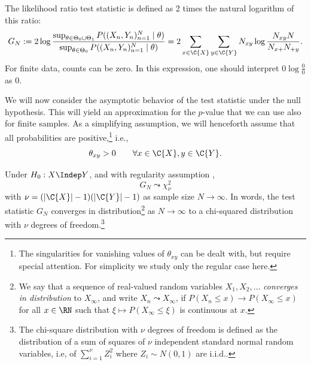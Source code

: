 The likelihood ratio test statistic is defined as 2 times the natural logarithm of this ratio:
\begin{equation}\label{eq:G_test_statistic}
  G_N := 2 \log \frac{\sup_{\theta\in\Theta_0\cup\Theta_1} P((X_n,Y_n)_{n=1}^N \mid \theta)}{\sup_{\theta\in\Theta_0} P((X_n,Y_n)_{n=1}^N \mid \theta)} = 2 \sum_{x\in\C{X}} \sum_{y\in\C{Y}} N_{xy} \log \frac{N_{xy} N}{N_{x+} N_{+ y}}.
\end{equation}
For finite data, counts can be zero. In this expression, one should interpret $0 \log \frac{0}{0}$ as $0$.

We will now consider the asymptotic behavior of the test statistic under the null hypothesis.
This will yield an approximation for the $p$-value that we can use also for finite samples.
As a simplifying assumption, we will henceforth assume that all probabilities are positive,\footnote{The singularities for vanishing values of $\theta_{xy}$ can be dealt with, but require special attention. For simplicity we study only the regular case here.} i.e.,
\begin{equation}\label{eq:G_test_regularity}
  \theta_{xy} > 0 \qquad \forall x \in \C{X}, y\in \C{Y}.
\end{equation}
\begin{Prp}\label{prp:G_test_asymptotics_H0}
Under $H_0 : X \Indep Y$, and with regularity assumption ,
$$G_N \leadsto \chi_\nu^2$$
with $\nu = (|\C{X}| - 1)(|\C{Y}| - 1)$ as sample size $N \to \infty$.
  In words, the test statistic $G_N$ converges in distribution\footnote{We say that a sequence of real-valued random variables $X_1,X_2,\dots$ \emph{converges in distribution} to $X_\infty$, and write $X_n \leadsto X_\infty$, if $P(X_n \le x) \to P(X_\infty \le x)$ for all $x \in \RN$ such that $\xi \mapsto P(X_\infty \le \xi)$ is continuous at $x$.} as $N \to \infty$ to a chi-squared distribution with $\nu$ degrees of freedom.\footnote{The chi-square distribution with $\nu$ degrees of freedom is defined as the distribution of a sum of squares of $\nu$ independent standard normal random variables, i.e, of $\sum_{i=1}^\nu Z_i^2$ where $Z_i \sim N(0,1)$ are i.i.d..}
\end{Prp}
